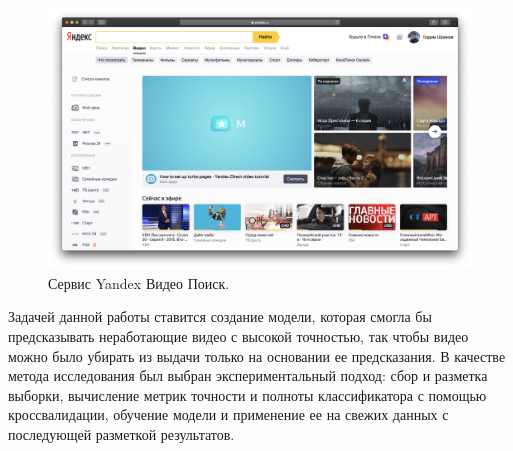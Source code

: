 \begin{figure}
    \centering
    \includegraphics[width=\textwidth]{../images/yandex_video}
    \caption{Сервис Yandex Видео Поиск.}
    \label{fig:yandex_video}
\end{figure}

Задачей данной работы ставится создание модели, которая смогла бы предсказывать неработающие видео с высокой точностью, так чтобы видео можно было убирать из выдачи только на основании ее предсказания. В качестве метода исследования был выбран экспериментальный подход: сбор и разметка выборки, вычисление метрик точности и полноты классификатора с помощью кроссвалидации, обучение модели и применение ее на свежих данных с последующей разметкой результатов.